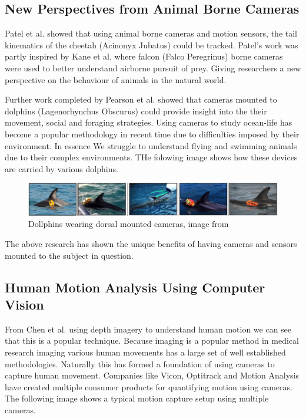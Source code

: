 \subsection{New Perspectives from Animal Borne Cameras}
Patel et al. \cite{patel2017trackingieee} showed that using animal borne cameras and motion sensors, the tail kinematics of the cheetah (Acinonyx Jubatus) could be tracked. Patel's work was partly inspired by Kane et al. \cite{kane2014falcons} where falcon (Falco Peregrinus) borne cameras were used to better understand airborne pursuit of prey. Giving researchers a new perspective on the behaviour of animals in the natural world.

Further work completed by Pearson et al. \cite{pearson2017testing} showed that cameras mounted to dolphins (Lagenorhynchus Obscurus) could provide insight into the their movement, social and foraging strategies. Using cameras to study ocean-life has become a popular methodology in recent time due to difficulties imposed by their environment. In essence We struggle to understand flying and swimming animals due to their complex environments. THe folowing image shows how these devices are carried by various dolphins.

\begin{figure}[!ht] 
\captionsetup{width=\linewidth, font=small}  
\includegraphics[width=\linewidth]{figures/dol.png}
\caption{Dollphins wearing dorsal mounted cameras, image from \cite{pearson2017testing}}
\label{fig:dol}
\end{figure}

The above research has shown the unique benefits of having cameras and sensors mounted to the subject in question.

\subsection{Human Motion Analysis Using Computer Vision}
From Chen et al.\cite{chen2013survey} using depth imagery to understand human motion we can see that this is a popular technique. Because imaging is a popular method in medical research imaging various human movements has a large set of well established methodologies. Naturally this has formed a foundation of using cameras to capture human movement. Companies like Vicon, Optitrack and Motion Analysis have created multiple consumer products for quantifying motion using cameras. The following image shows a typical motion capture setup using multiple cameras.

